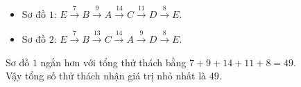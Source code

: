 \begin{ex}
{\begin{center}
		\end{center}
		\begin{itemize}
			\item Sơ đồ $1$: $E \xrightarrow{\,7\,} B \xrightarrow{\,9\,} A \xrightarrow{\,14\,} C \xrightarrow{\,11\,} D \xrightarrow{\,8\,} E$.
			\item Sơ đồ $2$: $E \xrightarrow{\,7\,} B \xrightarrow{\,13\,} C \xrightarrow{\,14\,} A \xrightarrow{\,9\,} D \xrightarrow{\,8\,} E$.
		\end{itemize}
		Sơ đồ $1$ ngắn hơn với tổng thử thách bằng $7+9+14+11+8=49$.\\
		Vậy tổng số thử thách nhận giá trị nhỏ nhất là $49$.
	}
\end{ex}

